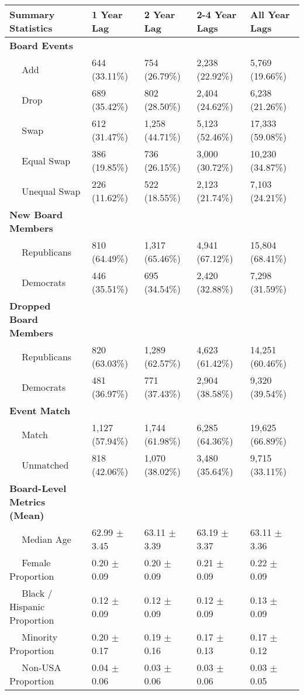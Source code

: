
\begin{tabular}{lllll}
\toprule
Summary Statistics & 1 Year Lag & 2 Year Lag & 2-4 Year Lags & All Year Lags\\
\midrule
\bf{Board Events} & ~ & ~ & ~ & ~\\
~~ Add & 644 (33.11\%) & 754 (26.79\%) & 2,238 (22.92\%) & 5,769 (19.66\%)\\
~~ Drop & 689 (35.42\%) & 802 (28.50\%) & 2,404 (24.62\%) & 6,238 (21.26\%)\\
~~ Swap & 612 (31.47\%) & 1,258 (44.71\%) & 5,123 (52.46\%) & 17,333 (59.08\%)\\
~~ Equal Swap & 386 (19.85\%) & 736 (26.15\%) & 3,000 (30.72\%) & 10,230 (34.87\%)\\
\addlinespace
~~ Unequal Swap & 226 (11.62\%) & 522 (18.55\%) & 2,123 (21.74\%) & 7,103 (24.21\%)\\
\bf{New Board Members} & ~ & ~ & ~ & ~\\
~~ Republicans & 810 (64.49\%) & 1,317 (65.46\%) & 4,941 (67.12\%) & 15,804 (68.41\%)\\
~~ Democrats & 446 (35.51\%) & 695 (34.54\%) & 2,420 (32.88\%) & 7,298 (31.59\%)\\
\bf{Dropped Board Members} & ~ & ~ & ~ & ~\\
\addlinespace
~~ Republicans & 820 (63.03\%) & 1,289 (62.57\%) & 4,623 (61.42\%) & 14,251 (60.46\%)\\
~~ Democrats & 481 (36.97\%) & 771 (37.43\%) & 2,904 (38.58\%) & 9,320 (39.54\%)\\
\bf{Event Match} & ~ & ~ & ~ & ~\\
~~ Match & 1,127 (57.94\%) & 1,744 (61.98\%) & 6,285 (64.36\%) & 19,625 (66.89\%)\\
~~ Unmatched & 818 (42.06\%) & 1,070 (38.02\%) & 3,480 (35.64\%) & 9,715 (33.11\%)\\
\addlinespace
\bf{Board-Level Metrics (Mean)} & ~ & ~ & ~ & ~\\
~~ Median Age & 62.99 $\pm$ 3.45 & 63.11 $\pm$ 3.39 & 63.19 $\pm$ 3.37 & 63.11 $\pm$ 3.36\\
~~ Female Proportion & 0.20 $\pm$ 0.09 & 0.20 $\pm$ 0.09 & 0.21 $\pm$ 0.09 & 0.22 $\pm$ 0.09\\
~~ Black / Hispanic Proportion & 0.12 $\pm$ 0.09 & 0.12 $\pm$ 0.09 & 0.12 $\pm$ 0.09 & 0.13 $\pm$ 0.09\\
~~ Minority Proportion & 0.20 $\pm$ 0.17 & 0.19 $\pm$ 0.16 & 0.17 $\pm$ 0.13 & 0.17 $\pm$ 0.12\\
\addlinespace
~~ Non-USA Proportion & 0.04 $\pm$ 0.06 & 0.03 $\pm$ 0.06 & 0.03 $\pm$ 0.06 & 0.03 $\pm$ 0.05\\

\end{tabular}
